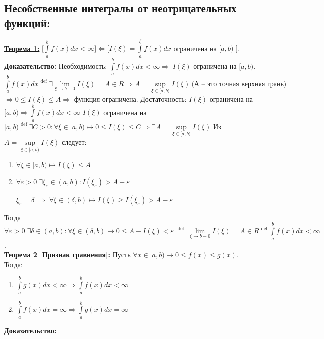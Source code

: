 \documentclass[a4paper,12pt]{article} %
\newcommand{\eqdef}{\stackrel{\mathrm{def}}{=}}
\renewcommand {\geq}{\geqslant}
\renewcommand {\leq}{\leqslant}
\renewcommand {\epsilon}{\varepsilon}
\begin{document}
\subsection{Несобственные интегралы от неотрицательных функций:}
\underline{\textbf{Теорема 1:}} $\bigl[ \int\limits_a^{b} f(x) dx <\infty \bigr] \Leftrightarrow \bigl[ I(\xi) = \int\limits_a^{\xi} f(x) dx$ \;ограничена\; на\; $[a, b)$ $\bigr]$.\\
\textbf{Доказательство:} 
Необходимость: $\int\limits_a^{b} f(x) dx < \infty \Rightarrow\; I(\xi)$ ограничена на $[a, b)$.
$\int\limits_a^{b} f(x) dx \stackrel{\text{def}}{=} \exists \lim\limits_{\xi \rightarrow b-0}I(\xi) = A \in R \Rightarrow A = \sup\limits_{\xi \in[a,b)} I(\xi) ~ \text{(А -- это точная верхняя грань)} $ $\Rightarrow 0 \leq I(\xi) \leq A \Rightarrow$ функция ограничена.
Достаточность: $I(\xi)$  ограничена на $[a, b) \Rightarrow \int\limits_a^{b} f(x) dx < \infty$
$I(\xi)$ ограничена на $[a, b) \stackrel{\text{def}}{=} \exists C>0 : \forall \xi \in[a, b) \longmapsto 0 \leq I(\xi) \leq C \Rightarrow \exists A = \sup\limits_{\xi \in [a,b)}I(\xi)$
Из $A = \sup\limits_{\xi \in[a,b)} I(\xi)$ следует:
\begin{enumerate}
	\item $\forall \xi \in [a, b) \mapsto I(\xi) \leq A$
	
	\item $\forall \varepsilon > 0\; \exists \xi_\varepsilon \in (a, b) : I(\xi_\varepsilon)>A-\varepsilon$
	
	$\xi_\varepsilon = \delta \; \Rightarrow \; \forall \xi \in(\delta, b) \longmapsto I(\xi) \geq I(\xi_\epsilon)> A-\varepsilon$
\end{enumerate}
Тогда $\forall \varepsilon > 0 \; \exists\delta\in(a, b): \forall \xi \in(\delta, b) \longmapsto 0\leq A-I(\xi) < \varepsilon \; \stackrel{\text{def}}{=}\; \lim\limits_{\xi \rightarrow b-0} I(\xi) = A \in R \eqdef \int\limits_a^{b} f(x) dx < \infty$.\\
\underline{\textbf{Теорема 2 [Признак сравнения]:}} Пусть $\forall x \in [a, b) \longmapsto 0\leq f(x) \leq g(x)$. Тогда:
\begin{enumerate}
	\item $\int\limits_a^{b} g(x) dx < \infty \Rightarrow \int\limits_a^{b} f(x) dx < \infty$
	
	\item $\int\limits_a^{b} f(x) dx = \infty \Rightarrow \int\limits_a^{b} g(x) dx = \infty$
\end{enumerate}
\textbf{Доказательство:}
\end{document}

